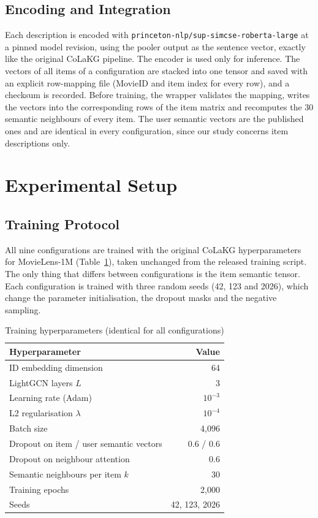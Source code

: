 \documentclass[a4paper,11pt]{article}
\begin{document}
\subsection{Encoding and Integration}
Each description is encoded with \texttt{princeton-nlp/sup-simcse-roberta-large} at a pinned model revision, using the pooler output as the sentence vector, exactly like the original CoLaKG pipeline. The encoder is used only for inference. The vectors of all items of a configuration are stacked into one tensor and saved with an explicit row-mapping file (MovieID and item index for every row), and a checksum is recorded. Before training, the wrapper validates the mapping, writes the vectors into the corresponding rows of the item matrix and recomputes the 30 semantic neighbours of every item. The user semantic vectors are the published ones and are identical in every configuration, since our study concerns item descriptions only.

\section{Experimental Setup}
\label{sec:setup}
\subsection{Training Protocol}
All nine configurations are trained with the original CoLaKG hyperparameters for MovieLens-1M (Table~\ref{tab:hyper}), taken unchanged from the released training script. The only thing that differs between configurations is the item semantic tensor. Each configuration is trained with three random seeds (42, 123 and 2026), which change the parameter initialisation, the dropout masks and the negative sampling.

\begin{table}[H]
\centering
\small
\begin{tabular}{lr}
\toprule
Hyperparameter & Value \\
\midrule
ID embedding dimension & 64 \\
LightGCN layers $L$ & 3 \\
Learning rate (Adam) & $10^{-3}$ \\
L2 regularisation $\lambda$ & $10^{-4}$ \\
Batch size & 4,096 \\
Dropout on item / user semantic vectors & 0.6 / 0.6 \\
Dropout on neighbour attention & 0.6 \\
Semantic neighbours per item $k$ & 30 \\
Training epochs & 2,000 \\
Seeds & 42, 123, 2026 \\
\bottomrule
\end{tabular}
\caption{Training hyperparameters (identical for all configurations)}
\label{tab:hyper}
\end{table}
\end{document}
